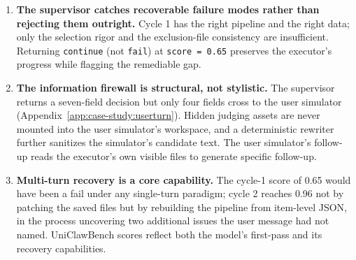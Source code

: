 \begin{enumerate}
  \item \textbf{The supervisor catches recoverable failure modes
  rather than rejecting them outright.} Cycle 1 has the right
  pipeline and the right data; only the selection rigor and the
  exclusion-file consistency are insufficient. Returning
  \texttt{continue} (not \texttt{fail}) at \texttt{score = 0.65}
  preserves the executor's progress while flagging the remediable
  gap.
  \item \textbf{The information firewall is structural, not
  stylistic.} The supervisor returns a seven-field decision but
  only four fields cross to the user simulator
  (Appendix~\ref{app:case-study:userturn}). Hidden judging assets are
  never mounted into the user simulator's workspace, and a
  deterministic rewriter further sanitizes the simulator's
  candidate text. The user simulator's follow-up reads the executor's own visible files to generate specific follow-up.
  \item \textbf{Multi-turn recovery is a core capability.} The
  cycle-1 score of 0.65 would have been a fail under any single-turn
  paradigm; cycle 2 reaches 0.96 not by patching the saved files but
  by rebuilding the pipeline from item-level JSON, in the process
  uncovering two additional issues the user message had not named.
  UniClawBench scores reflect both the model's first-pass and its
  recovery capabilities.
\end{enumerate}

